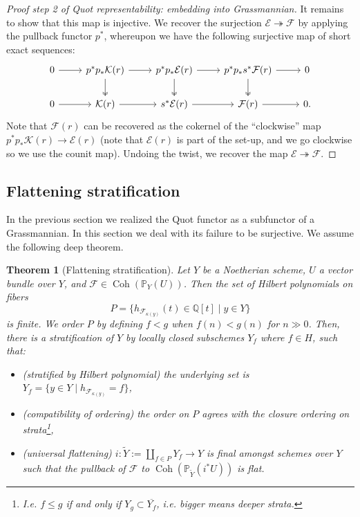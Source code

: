 \documentclass[10pt]{article}
\newtheorem{thm}{Theorem}[section]
\theoremstyle{definition}
\DeclareMathOperator{\Coh}{Coh}
\newcommand{\PP}{\mathbb{P}}
\newcommand{\Q}{\mathbb{Q}}
\begin{document}
\begin{proof}[Proof step 2 of Quot representability: embedding into Grassmannian]
It remains to show that this map is injective.  We recover the surjection $\mathcal{E} \twoheadrightarrow \mathcal{F}$ by applying the pullback functor $p^*$, whereupon we have the following surjective map of short exact sequences:
$$\begin{tikzcd}
0 \arrow[r] & p^* p_*\mathcal{K}(r) \arrow[r] \arrow[d, two heads] & p^* p_* \mathcal{E}(r) \arrow[r] \arrow[d, two heads] & p^* p_* s^*\mathcal{F}(r) \arrow[r] \arrow[d, two heads] & 0 \\
0 \arrow[r] & \mathcal{K}(r) \arrow[r] & s^*\mathcal{E}(r) \arrow[r] & \mathcal{F}(r) \arrow[r] & 0.
\end{tikzcd}$$
Note that $\mathcal{F}(r)$ can be recovered as the cokernel of the ``clockwise'' map $p^*p_*\mathcal{K}(r) \rightarrow \mathcal{E}(r)$ (note that $\mathcal{E}(r)$ is part of the set-up, and we go clockwise so we use the counit map).  Undoing the twist, we recover the map $\mathcal{E} \twoheadrightarrow \mathcal{F}$.
\end{proof}



\subsection{Flattening stratification}

In the previous section we realized the Quot functor as a subfunctor of a Grassmannian.  In this section we deal with its failure to be surjective.  We assume the following deep theorem.
\begin{thm}[Flattening stratification]
Let $Y$ be a Noetherian scheme, $U$ a vector bundle over $Y$,  and $\mathcal{F} \in \Coh(\PP_Y(U))$.  Then the set of Hilbert polynomials on fibers
$$P = \{h_{\mathcal{F}_{\kappa(y)}}(t) \in \Q[t] \mid y \in Y\}$$
is finite.  We order $P$ by defining $f < g$ when $f(n) < g(n)$ for $n \gg 0$.  Then, there is a stratification of $Y$ by locally closed subschemes $Y_f$ where $f \in H$, such that:
\begin{itemize}
\item (stratified by Hilbert polynomial) the underlying set is $Y_f = \{y \in Y \mid h_{\mathcal{F}_{\kappa(y)}} = f\}$,
\item (compatibility of ordering) the order on $P$ agrees with the closure ordering on strata\footnote{I.e. $f \leq g$ if and only if $Y_g \subset \overline{Y_f}$, i.e. bigger means deeper strata.},
\item (universal flattening) $i: \tilde{Y} := \coprod_{f \in P} Y_f \rightarrow Y$ is final amongst schemes over $Y$ such that the pullback of $\mathcal{F}$ to $\Coh(\PP_{\tilde{Y}}(i^*U))$ is flat.
\end{itemize}
\end{thm}
\end{document}
